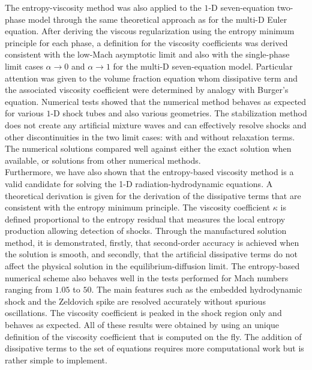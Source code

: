 The entropy-viscosity method was also applied to the $1$-D seven-equation two-phase model through the same theoretical approach as for the multi-D Euler equation. After deriving the viscous regularization using the entropy minimum principle for each phase, a definition for the viscosity coefficients was derived consistent with the low-Mach asymptotic limit and also with the single-phase limit cases $\alpha \to 0$ and $\alpha \to 1$ for the multi-D seven-equation model. Particular attention was given to the volume fraction equation whom dissipative term and the associated viscosity coefficient were determined by analogy with Burger's equation. 
Numerical tests showed that the numerical method behaves as expected for various $1$-D shock tubes and also various geometries. The stabilization method does not create any artificial mixture waves and can effectively resolve shocks and other discontinuities in the two limit cases: with and without relaxation terms. The numerical solutions compared well against either the exact solution when available, or solutions from other numerical methods.\\

Furthermore, we have also shown that the entropy-based viscosity method is a valid candidate for solving the 1-D radiation-hydrodynamic equations. A theoretical derivation is given for the derivation of the dissipative terms that are consistent with the entropy minimum principle. The viscosity coefficient $\kappa$ is defined proportional to the entropy residual that measures the local entropy production allowing detection of shocks. Through the manufactured solution method, it is demonstrated, firstly, that second-order accuracy is achieved when the solution is smooth, and secondly, that the artificial dissipative terms do not affect the physical solution in the equilibrium-diffusion limit. 
The entropy-based numerical scheme also behaves well in the tests performed for Mach numbers ranging from $1.05$ to $50$. The main features such as the embedded hydrodynamic shock and the Zeldovich spike are resolved accurately without spurious oscillations. The viscosity coefficient is peaked in the shock region only and behaves as expected. All of these results were obtained by using an unique definition of the viscosity coefficient that is computed on the fly. The addition of dissipative terms to the set of equations requires more computational work but is rather simple to implement.\\

